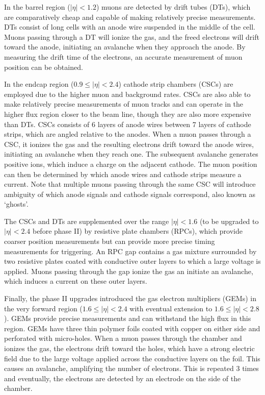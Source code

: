 \documentclass[10pt,a4paper]{article}
\begin{document}
In the barrel region ($|\eta|<1.2$) muons are detected by drift tubes (DTs), which are comparatively cheap and capable of making relatively precise measurements. DTs consist of long cells with an anode wire suspended in the middle of the cell. Muons passing through a DT will ionize the gas, and the freed electrons will drift toward the anode, initiating an avalanche when they approach the anode. By measuring the drift time of the electrons, an accurate measurement of muon position can be obtained. 

In the endcap region ($0.9\leq |\eta|<2.4$) cathode strip chambers (CSCs) are employed due to the higher muon and background rates. CSCs are also able to make relatively precise measurements of muon tracks and can operate in the higher flux region closer to the beam line, though they are also more expensive than DTs. CSCs consists of 6 layers of anode wires between 7 layers of cathode strips, which are angled relative to the anodes. When a muon passes through a CSC, it ionizes the gas and the resulting electrons drift toward the anode wires, initiating an avalanche when they reach one. The subsequent avalanche generates positive ions, which induce a charge on the adjacent cathode. The muon position can then be determined by which anode wires and cathode strips measure a current. Note that multiple muons passing through the same CSC will introduce ambiguity of which anode signals and cathode signals correspond, also known as `ghosts'.

The CSCs and DTs are supplemented over the range $|\eta|<1.6$ (to be upgraded to $|\eta|<2.4$ before phase II) by resistive plate chambers (RPCs), which provide coarser position measurements but can provide more precise timing measurements for triggering. An RPC gap contains a gas mixture surrounded by two resistive plates coated with conductive outer layers to which a large voltage is applied. Muons passing through the gap ionize the gas an initiate an avalanche, which induces a current on these outer layers. 

Finally, the phase II upgrades introduced the gas electron multipliers (GEMs) in the very forward region ($1.6\leq |\eta|<2.4$ with eventual extension to $1.6\leq |\eta|<2.8$). GEMs provide precise measurements and can withstand the high flux in this region. GEMs have three thin polymer foils coated with copper on either side and perforated with micro-holes. When a muon passes through the chamber and ionizes the gas, the electrons drift toward the holes, which have a strong electric field due to the large voltage applied across the conductive layers on the foil. This causes an avalanche, amplifying the number of electrons. This is repeated 3 times and eventually, the electrons are detected by an electrode on the side of the chamber.
\end{document}
